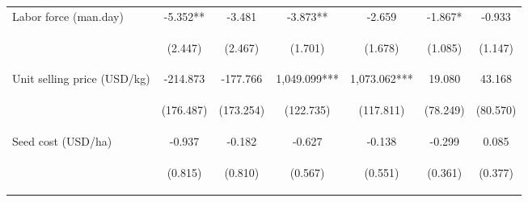 \begin{center}
\begin{tabular}{lcccccc}
Labor force (man.day) & -5.352** & -3.481 & -3.873** & -2.659 & -1.867* & -0.933 \\
\vspace{4pt} & \begin{footnotesize}(2.447)\end{footnotesize} & \begin{footnotesize}(2.467)\end{footnotesize} & \begin{footnotesize}(1.701)\end{footnotesize} & \begin{footnotesize}(1.678)\end{footnotesize} & \begin{footnotesize}(1.085)\end{footnotesize} & \begin{footnotesize}(1.147)\end{footnotesize} \\
Unit selling price (USD/kg) & -214.873 & -177.766 & 1,049.099*** & 1,073.062*** & 19.080 & 43.168 \\
\vspace{4pt} & \begin{footnotesize}(176.487)\end{footnotesize} & \begin{footnotesize}(173.254)\end{footnotesize} & \begin{footnotesize}(122.735)\end{footnotesize} & \begin{footnotesize}(117.811)\end{footnotesize} & \begin{footnotesize}(78.249)\end{footnotesize} & \begin{footnotesize}(80.570)\end{footnotesize} \\
Seed cost (USD/ha) & -0.937 & -0.182 & -0.627 & -0.138 & -0.299 & 0.085 \\
\vspace{4pt} & \begin{footnotesize}(0.815)\end{footnotesize} & \begin{footnotesize}(0.810)\end{footnotesize} & \begin{footnotesize}(0.567)\end{footnotesize} & \begin{footnotesize}(0.551)\end{footnotesize} & \begin{footnotesize}(0.361)\end{footnotesize} & \begin{footnotesize}(0.377)\end{footnotesize} \\

\end{tabular}
\end{center}
